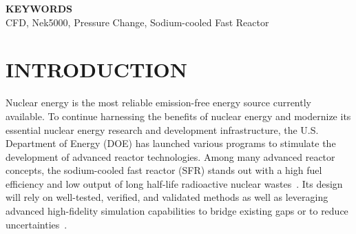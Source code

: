 \documentclass[11pt,letterpaper,english]{article}
\begin{document}
\begin{flushleft}
{\bf KEYWORDS} \\
 CFD, Nek5000, Pressure Change, Sodium-cooled Fast Reactor
\end{flushleft}

\section{INTRODUCTION}

Nuclear energy is the most reliable emission-free energy source currently available. To continue harnessing the benefits of nuclear energy and modernize its essential nuclear energy research and development infrastructure, the U.S. Department of Energy (DOE) has launched various programs to stimulate the development of advanced reactor technologies. Among many advanced reactor concepts, the sodium-cooled fast reactor (SFR) stands out with a high fuel efficiency and low output of long half-life radioactive nuclear wastes~\citep{Shaver2019a}. Its design will rely on well-tested, verified, and validated methods as well as leveraging advanced high-fidelity simulation capabilities to bridge existing gaps or to reduce uncertainties~\citep{Shaver2019b}. 
\end{document}
